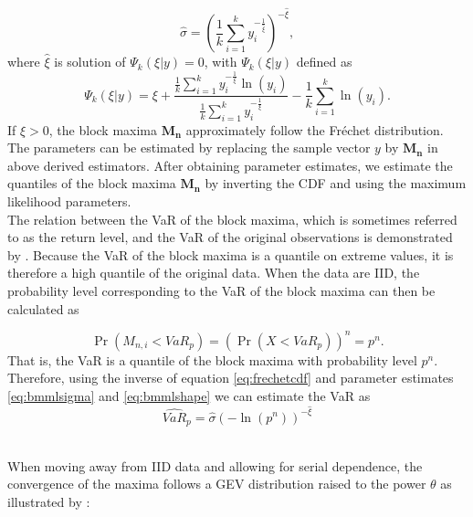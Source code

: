 \documentclass[a4paper,12pt]{article}
\theoremstyle{plain}
\begin{document}
\begin{equation}
    \hat{\sigma} = \left(\frac{1}{k}\sum^k_{i=1}y_i^{-\frac{1}{\hat{\xi}}}\right)^{-\hat{\xi}},
    \label{eq:bmmlsigma}
\end{equation}
\noindent where $\hat{\xi}$ is solution of $\Psi_k\left(\xi|y\right)=0$, with $\Psi_k\left(\xi|y\right)$ defined as
\begin{equation}
        \Psi_k\left(\xi|y\right) = \xi + \frac{\frac{1}{k}\sum^k_{i=1}y_i^{-\frac{1}{\xi}}\ln{\left(y_i\right)}}{\frac{1}{k}\sum^k_{i=1}y_i^{-\frac{1}{\xi}}} - \frac{1}{k}\sum^k_{i=1}\ln{\left(y_i\right)}.
        \label{eq:bmmlshape}
\end{equation}
If $\xi>0$, the block maxima $\bm{M_n}$ approximately follow the Fr\'echet distribution. The parameters can be estimated by replacing the sample vector $y$ by $\bm{M_n}$ in above derived estimators. After obtaining parameter estimates, we estimate the quantiles of the block maxima $\bm{M_n}$ by inverting the CDF and using the maximum likelihood parameters. \\

The relation between the VaR of the block maxima, which is sometimes referred to as the return level, and the VaR of the original observations is demonstrated by . Because the VaR of the block maxima is a quantile on extreme values, it is therefore a high quantile of the original data. When the data are IID, the probability level corresponding to the VaR of the block maxima can then be calculated as

\begin{equation}
    \Pr\left(M_{n,i}<VaR_p\right)=\left(\Pr\left(X<VaR_p\right)\right)^n=p^n.
    \label{eq:relationrlvar}
\end{equation}
That is, the VaR is a quantile of the block maxima with probability level $p^n$. Therefore, using the inverse of equation \eqref{eq:frechetcdf} and parameter estimates \eqref{eq:bmmlsigma} and \eqref{eq:bmmlshape} we can estimate the VaR as
\begin{equation}
    \widehat{VaR}_p = \hat{\sigma}\left(-\ln{\left(p^n\right)}\right)^{-\hat{\xi}}
    \label{eq:bmestvariid}
\end{equation}

\\

When moving away from IID data and allowing for serial dependence, the convergence of the maxima follows a GEV distribution raised to the power $\theta$ as illustrated by :
\end{document}
